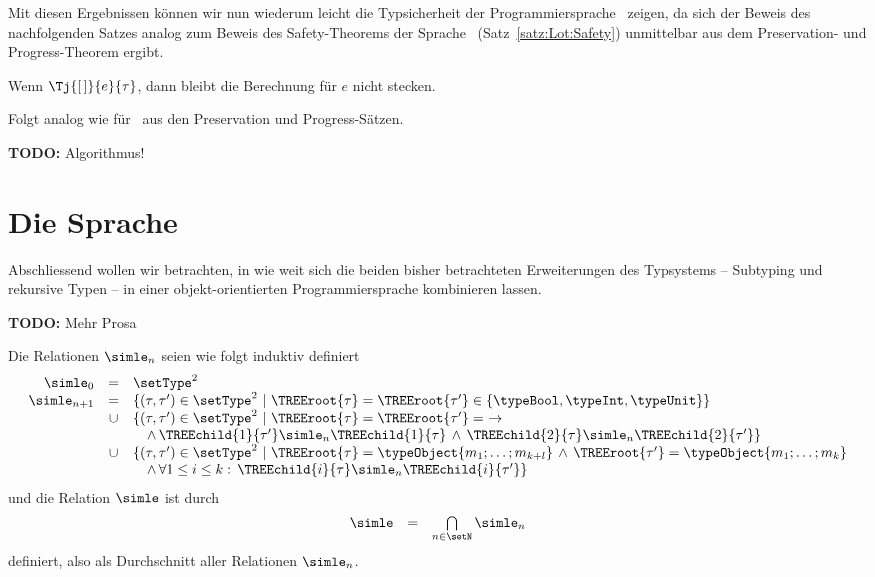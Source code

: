 %
Mit diesen Ergebnissen k\"onnen wir nun wiederum leicht die Typsicherheit der Programmiersprache \Lort\ zeigen,
da sich der Beweis des nachfolgenden Satzes analog zum Beweis des Safety-Theorems der Sprache \Lot\ (Satz~\ref{satz:Lot:Safety})
unmittelbar aus dem Preservation- und Progress-Theorem ergibt.

\begin{satz} \label{satz:Lort:Safety} 
  Wenn $\Tj{[\,]}{e}{\tau}$, dann bleibt die Berechnung f\"ur $e$ nicht stecken.
\end{satz}

\begin{beweis}
  Folgt analog wie f\"ur \Lot\ aus den Preservation und Progress-S\"atzen.
\end{beweis}


{\bf TODO:} Algorithmus!




\section{Die Sprache \Losrt}

Abschliessend wollen wir betrachten, in wie weit sich die beiden bisher betrachteten Erweiterungen des Typsystems
-- Subtyping und rekursive Typen -- in einer objekt-orientierten Programmiersprache kombinieren lassen.

{\bf TODO:} Mehr Prosa

\begin{definition} \label{definition:Losrt:Subtyping_Relation}
  Die Relationen $\simle_n$ seien wie folgt induktiv definiert
  \[\begin{array}{rcl}
    \simle_0     &   =  & \setType^2 \\
    \simle_{n+1} &   =  & \{(\tau,\tau')\in\setType^2\ |\ \TREEroot{\tau} = \TREEroot{\tau'} \in \{\typeBool,\typeInt,\typeUnit\}\} \\
                 & \cup & \{(\tau,\tau')\in\setType^2\ |\ \TREEroot{\tau} = \TREEroot{\tau'} =\ \to \\
                 &      & \quad \wedge\,\TREEchild{1}{\tau'} \simle_n \TREEchild{1}{\tau}
                              \,\wedge\,\TREEchild{2}{\tau} \simle_n \TREEchild{2}{\tau'}\} \\
                 & \cup & \{(\tau,\tau')\in\setType^2\ |\ \TREEroot{\tau} = \typeObject{m_1;\ldots;m_{k+l}}
                                                \,\wedge\,\TREEroot{\tau'} = \typeObject{m_1;\ldots;m_k} \\
                 &      & \quad \wedge\,\forall 1 \le i \le k:\,\TREEchild{i}{\tau} \simle_n \TREEchild{i}{\tau'}\} 
  \end{array}\]
  und die Relation $\simle$ ist durch
  \[\begin{array}{rcl}
    \simle & = & \bigcap\limits_{n\in\setN} \simle_n
  \end{array}\]
  definiert, also als Durchschnitt aller Relationen $\simle_n$.
\end{definition}

